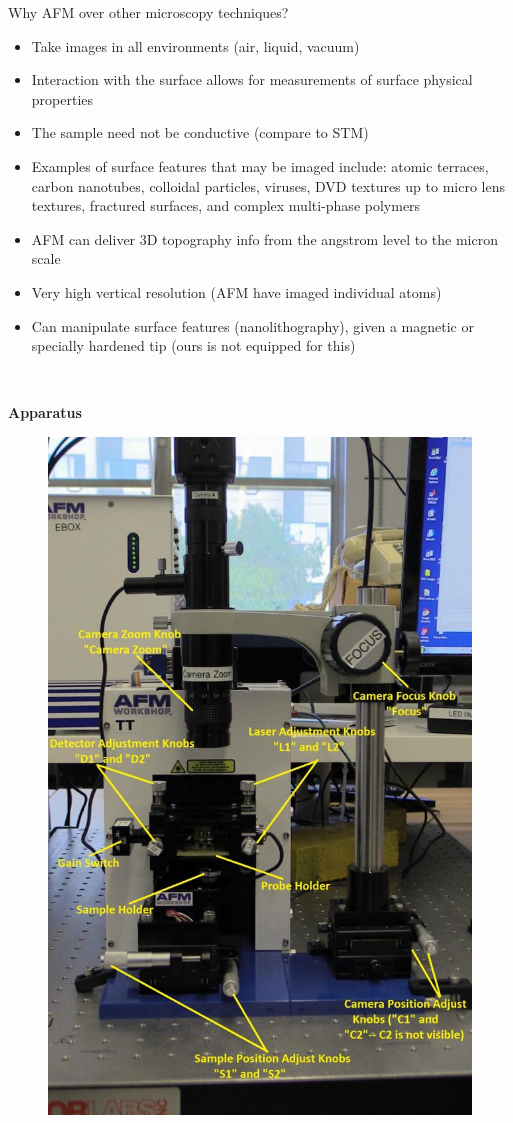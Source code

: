 \documentclass{../lab}
\begin{document}
Why AFM over other microscopy techniques?

\begin{itemize}
    \item Take images in all environments (air, liquid, vacuum)

    \item Interaction with the surface allows for measurements of surface physical properties

    \item The sample need not be conductive (compare to STM)

    \item Examples of surface features that may be imaged include: atomic terraces, carbon nanotubes, colloidal particles, viruses, DVD textures up to micro lens textures, fractured surfaces, and complex multi-phase polymers

    \item AFM can deliver 3D topography info from the angstrom level to the micron scale

    \item Very high vertical resolution (AFM have imaged individual atoms)

    \item Can manipulate surface features (nanolithography), given a magnetic or specially hardened tip (ours is not equipped for this)

\end{itemize}

\textbf{​}

\textbf{Apparatus}


\begin{figure}[h]
    \centering
    \href{http://dev-physicsadv.pantheon.berkeley.edu/sites/default/files/AFMImages/AFMgen.jpg}{\includegraphics[width=0.5\linewidth]{images/AFMgen.jpg}}
    \caption{}
    \label{fig:AFMgen}
\end{figure}
\end{document}
